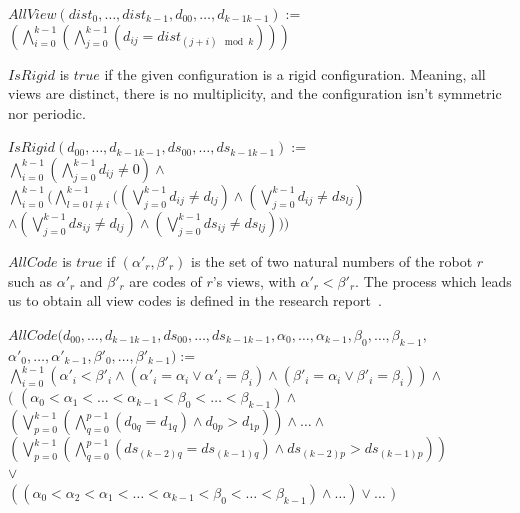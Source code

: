 \documentclass{article}
\begin{document}
\begin{center}
    
$AllView(dist_{0}, \ldots ,dist_{k-1}, d_{00}, \ldots ,d_{k-1k-1}):=$\\
$(\bigwedge_{i=0}^{k-1} (\bigwedge_{j=0}^{k-1} (d_{ij} = dist_{(j+i) \mod{k}}) ) )$
\end{center}

$IsRigid$ is $true$ if the given configuration is a rigid configuration. Meaning, all views are distinct, there is no multiplicity, and the configuration isn't symmetric nor periodic.

\begin{center}

$IsRigid(d_{00}, \ldots ,d_{k-1k-1}, ds_{00}, \ldots ,ds_{k-1k-1}):=$\\
$\bigwedge_{i=0}^{k-1}(\bigwedge_{j=0}^{k-1}d_{ij}\not=0)\land $\\%
$\bigwedge_{i=0}^{k-1}(
\bigwedge_{l=0\ l\not=i}^{k-1}(
(\bigvee_{j=0}^{k-1}d_{ij} \not= d_{lj})
\land (\bigvee_{j=0}^{k-1}d_{ij} \not= ds_{lj})$\\
$\land (\bigvee_{j=0}^{k-1}ds_{ij} \not= d_{lj})
\land (\bigvee_{j=0}^{k-1}ds_{ij} \not= ds_{lj})
) )$\\%
\end{center}

$AllCode$ is $true$ if $(\alpha'_{r}, \beta'_{r})$ is the set of two natural numbers of the robot $r$ such as $\alpha'_r$ and $\beta'_r$ are codes of $r$'s views, with $\alpha'_{r} < \beta'_{r}$. The process which leads us to obtain all view codes is defined in the research report~\cite{gathering}. 

\begin{center}
$AllCode(d_{00}, \ldots ,d_{k-1k-1}, ds_{00}, \ldots ,ds_{k-1k-1}, \alpha_{0}, \dots, \alpha_{k-1}, \beta_{0}, \dots, \beta_{k-1},$\\
$\alpha'_{0}, \dots, \alpha'_{k-1}, \beta'_{0}, \dots, \beta'_{k-1}) :=$\\
$\bigwedge_{i = 0}^{k-1} \left( \alpha'_{i} < \beta'_{i} \land (\alpha'_{i} = \alpha_{i} \lor \alpha'_{i} = \beta_{i}) \land (\beta'_{i} = \alpha_{i} \lor \beta'_{i} = \beta_{i}) \right) \land $\\
$($
$(\alpha_{0} < \alpha_{1} < \dots < \alpha_{k-1} < \beta_{0} < \dots < \beta_{k-1}) \land $\\
$(\bigvee_{p=0}^{k-1}(\bigwedge_{q=0}^{p-1}(d_{0q} = d_{1q}) \land d_{0p} > d_{1p} ) )\land \dots \land $\\
$(\bigvee_{p=0}^{k-1}(\bigwedge_{q=0}^{p-1}(ds_{(k-2)q} = ds_{(k-1)q}) \land ds_{(k-2)p} > ds_{(k-1)p} ) )$\\
$\lor $\\
$((\alpha_{0} < \alpha_{2} < \alpha_{1} < \dots < \alpha_{k-1} < \beta_{0} < \dots < \beta_{k-1}) \land \dots) \lor \dots$
$)$
\end{center}
\end{document}
